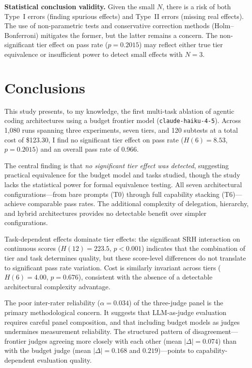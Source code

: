 \documentclass[11pt]{article}
\begin{document}
\textbf{Statistical conclusion validity.} Given the small $N$, there is a
risk of both Type~I errors (finding spurious effects) and Type~II errors
(missing real effects). The use of non-parametric tests and conservative
correction methods (Holm--Bonferroni) mitigates the former, but the latter
remains a concern. The non-significant tier effect on pass rate ($p=0.2015$)
may reflect either true tier equivalence or insufficient power to detect
small effects with $N=3$.

\section{Conclusions}
\label{sec:conclusions}

This study presents, to my knowledge, the first multi-task ablation of
agentic coding architectures using a budget frontier model (\texttt{claude-haiku-4-5}).
Across 1,080 runs spanning three experiments, seven tiers, and 120 subtests
at a total cost of \$123.30, I find no significant tier effect on pass rate
($H(6)=8.53$, $p=0.2015$) and an overall pass rate of 0.966.

The central finding is that \emph{no significant tier effect was detected},
suggesting practical equivalence for the budget model and tasks studied,
though the study lacks the statistical power for formal equivalence testing.
All seven architectural configurations---from bare prompts (T0) through full
capability stacking (T6)---achieve comparable pass rates. The additional
complexity of delegation, hierarchy, and hybrid architectures provides no
detectable benefit over simpler configurations.

Task-dependent effects dominate tier effects: the significant SRH interaction
on continuous scores ($H(12) = 223.5$, $p < 0.001$) indicates that the
combination of tier and task determines quality, but these score-level
differences do not translate to significant pass rate variation. Cost is
similarly invariant across tiers ($H(6) = 4.00$, $p = 0.676$), consistent
with the absence of a detectable architectural complexity advantage.

The poor inter-rater reliability ($\alpha = 0.034$) of the three-judge
panel is the primary methodological concern. It suggests that LLM-as-judge
evaluation requires careful panel composition, and that including budget
models as judges undermines measurement reliability. The structured pattern
of disagreement---frontier judges agreeing more closely with each other
(mean $|\Delta| = 0.074$) than with the budget judge (mean $|\Delta| = 0.168$
and $0.219$)---points to capability-dependent evaluation quality.
\end{document}
